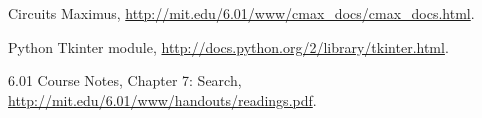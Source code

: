 \documentclass[12pt, doublespacing]{amsart}
\begin{document}
\begin{thebibliography}{9}

Circuits Maximus,
\url{http://mit.edu/6.01/www/cmax_docs/cmax_docs.html}.

Python Tkinter module, \url{http://docs.python.org/2/library/tkinter.html}.

6.01 Course Notes, Chapter 7: Search, \url{http://mit.edu/6.01/www/handouts/readings.pdf}.

\end{thebibliography}
\end{document}
